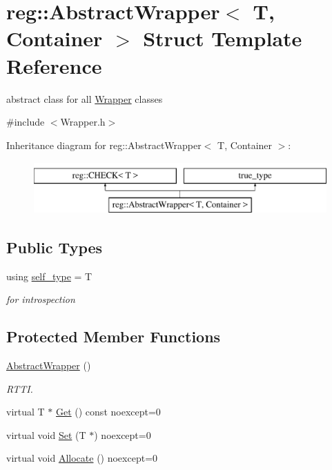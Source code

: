 \hypertarget{structreg_1_1_abstract_wrapper}{}\section{reg\+:\+:Abstract\+Wrapper$<$ T, Container $>$ Struct Template Reference}
\label{structreg_1_1_abstract_wrapper}


abstract class for all \hyperlink{structreg_1_1_wrapper}{Wrapper} classes  




{\ttfamily \#include $<$Wrapper.\+h$>$}

Inheritance diagram for reg\+:\+:Abstract\+Wrapper$<$ T, Container $>$\+:\begin{figure}[H]
\begin{center}
\leavevmode
\includegraphics[height=2.000000cm]{structreg_1_1_abstract_wrapper}
\end{center}
\end{figure}
\subsection*{Public Types}
\begin{DoxyCompactItemize}
\item 
using \hyperlink{structreg_1_1_abstract_wrapper_a65e2282260e636ac1956862c158caa59}{self\+\_\+type} = T
\begin{DoxyCompactList}\small\item\em for introspection \end{DoxyCompactList}\end{DoxyCompactItemize}
\subsection*{Protected Member Functions}
\begin{DoxyCompactItemize}
\item 
\hyperlink{structreg_1_1_abstract_wrapper_a1b932145981f0c3f71466707725d772f}{Abstract\+Wrapper} ()
\begin{DoxyCompactList}\small\item\em R\+T\+TI. \end{DoxyCompactList}\item 
virtual T $\ast$ \hyperlink{structreg_1_1_abstract_wrapper_a88e7079432573b09a5cd695be34e9147}{Get} () const noexcept=0
\item 
virtual void \hyperlink{structreg_1_1_abstract_wrapper_af017f2af039fd5b940345e930e4bb397}{Set} (T $\ast$) noexcept=0
\item 
virtual void \hyperlink{structreg_1_1_abstract_wrapper_aad461ca147a0a7fcfd4f8662994742f3}{Allocate} () noexcept=0
\end{DoxyCompactItemize}
